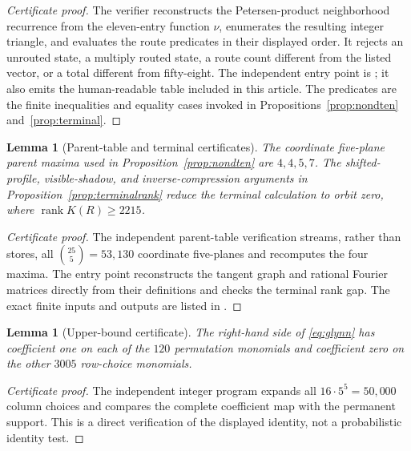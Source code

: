 \documentclass[11pt,reqno]{amsart}
\newtheorem{lemma}[theorem]{Lemma}
\theoremstyle{definition}
\newcommand{\rank}{\operatorname{rank}}
\begin{document}
\begin{proof}[Certificate proof]
The verifier reconstructs the Petersen-product neighborhood recurrence from
the eleven-entry function \(\nu\), enumerates the resulting integer triangle,
and evaluates the route predicates in their displayed order. It rejects an
unrouted state, a multiply routed state, a route count different from the
listed vector, or a total different from fifty-eight. The independent entry
point is ; it also emits the
human-readable table included in this article. The predicates are the
finite inequalities and equality cases invoked in
Propositions~\ref{prop:nondten} and~\ref{prop:terminal}.
\end{proof}

\begin{lemma}[Parent-table and terminal certificates]
\label{lem:certificate-terminal}
The coordinate five-plane parent maxima used in
Proposition~\ref{prop:nondten} are \(4,4,5,7\). The shifted-profile,
visible-shadow, and inverse-compression arguments in
Proposition~\ref{prop:terminalrank} reduce the terminal calculation to orbit
zero, where \(\rank K(R)\ge2215\).
\end{lemma}

\begin{proof}[Certificate proof]
The independent parent-table verification streams, rather than stores, all
\(\binom{25}{5}=53{,}130\) coordinate five-planes and recomputes the four
maxima. The entry point
 reconstructs the tangent
graph and rational Fourier matrices directly from their definitions and
checks the terminal rank gap. The exact finite inputs and outputs are listed in
.
\end{proof}

\begin{lemma}[Upper-bound certificate]
\label{lem:certificate-glynn}
The right-hand side of \eqref{eq:glynn} has coefficient one on each of the
\(120\) permutation monomials and coefficient zero on the other \(3005\)
row-choice monomials.
\end{lemma}

\begin{proof}[Certificate proof]
The independent integer program
 expands all
\(16\cdot5^5=50{,}000\) column choices and compares the complete coefficient
map with the permanent support. This is a direct verification of the displayed
identity, not a probabilistic identity test.
\end{proof}
\end{document}
